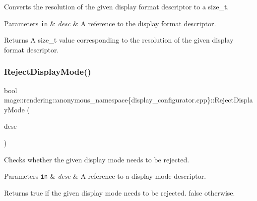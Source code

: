 Converts the resolution of the given display format descriptor to a {\ttfamily size\+\_\+t}.


\begin{DoxyParams}[1]{Parameters}
\mbox{\tt in}  & {\em desc} & A reference to the display format descriptor. \\
\hline
\end{DoxyParams}
\begin{DoxyReturn}{Returns}
A {\ttfamily size\+\_\+t} value corresponding to the resolution of the given display format descriptor. 
\end{DoxyReturn}
\mbox{\label{namespacemage_1_1rendering_1_1anonymous__namespace_02display__configurator_8cpp_03_adcb562662bd203427f9c0fe08912e491}} 
\subsubsection{\texorpdfstring{Reject\+Display\+Mode()}{RejectDisplayMode()}}
{\footnotesize\ttfamily bool mage\+::rendering\+::anonymous\+\_\+namespace\{display\+\_\+configurator.\+cpp\}\+::Reject\+Display\+Mode (\begin{DoxyParamCaption}\item[{const D\+X\+G\+I\+\_\+\+M\+O\+D\+E\+\_\+\+D\+E\+SC \&}]{desc }\end{DoxyParamCaption})\hspace{0.3cm}{\ttfamily [noexcept]}}

Checks whether the given display mode needs to be rejected.


\begin{DoxyParams}[1]{Parameters}
\mbox{\tt in}  & {\em desc} & A reference to a display mode descriptor. \\
\hline
\end{DoxyParams}
\begin{DoxyReturn}{Returns}
{\ttfamily true} if the given display mode needs to be rejected. {\ttfamily false} otherwise. 
\end{DoxyReturn}
